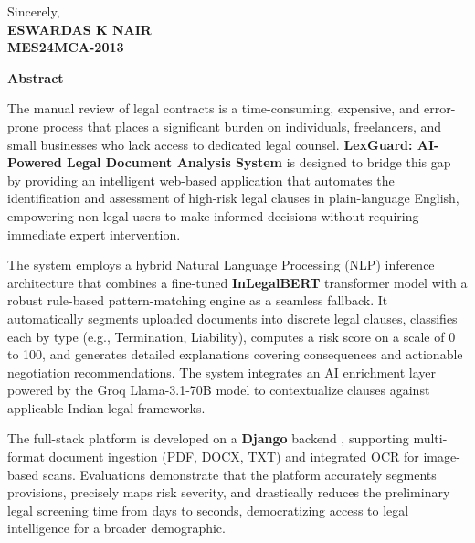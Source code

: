 \documentclass[a4paper,12pt]{report}
\begin{document}
\vspace{3cm} 

\begin{flushright}
Sincerely,\\
\textbf{ESWARDAS K NAIR}\\
\textbf{MES24MCA-2013}
\end{flushright}


\newpage
\begin{center}
\Large\textbf{Abstract}
\end{center}

The manual review of legal contracts is a time-consuming, expensive, and error-prone process that places a significant burden on individuals, freelancers, and small businesses who lack access to dedicated legal counsel. \textbf{LexGuard: AI-Powered Legal Document Analysis System} is designed to bridge this gap by providing an intelligent web-based application that automates the identification and assessment of high-risk legal clauses in plain-language English, empowering non-legal users to make informed decisions without requiring immediate expert intervention.

The system employs a hybrid Natural Language Processing (NLP) inference architecture that combines a fine-tuned \textbf{InLegalBERT} transformer model with a robust rule-based pattern-matching engine as a seamless fallback. It automatically segments uploaded documents into discrete legal clauses, classifies each by type (e.g., Termination, Liability), computes a risk score on a scale of 0 to 100, and generates detailed explanations covering consequences and actionable negotiation recommendations. The system integrates an AI enrichment layer powered by the Groq Llama-3.1-70B model to contextualize clauses against applicable Indian legal frameworks. 

The full-stack platform is developed on a \textbf{Django} backend \cite{django}, supporting multi-format document ingestion (PDF, DOCX, TXT) and integrated OCR for image-based scans. Evaluations demonstrate that the platform accurately segments provisions, precisely maps risk severity, and drastically reduces the preliminary legal screening time from days to seconds, democratizing access to legal intelligence for a broader demographic.

\newpage

\tableofcontents
\newpage
\listoffigures
\newpage
\listoftables
\end{document}
